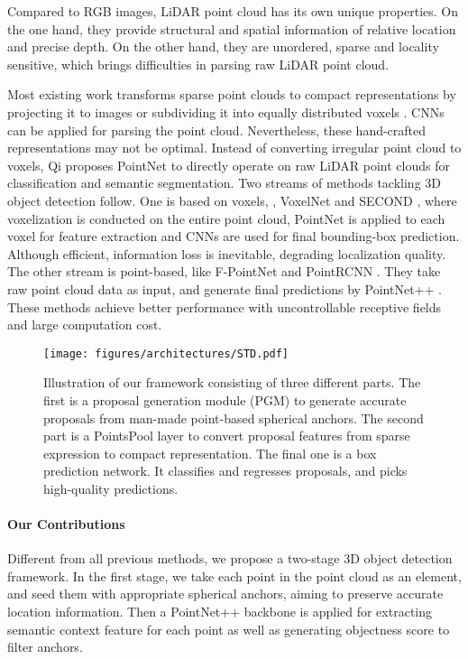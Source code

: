 \documentclass[10pt,twocolumn,letterpaper]{article}
\begin{document}
Compared to RGB images, LiDAR point cloud has its own unique properties. On the one hand, they provide structural and spatial information of relative location and precise depth. On the other hand, they are unordered, sparse and locality sensitive, which brings difficulties in parsing raw LiDAR point cloud.

Most existing work transforms sparse point clouds to compact representations by projecting it to images \cite{MV3D,AVOD,MultiViewRandomForest,PedestrianDetectionCombine,Vote3Deep} or subdividing it into equally distributed voxels \cite{VoxNet,VotetoVote,VOXELNET,YangLU18}. CNNs can be applied for parsing the point cloud. Nevertheless, these hand-crafted representations may not be optimal. Instead of converting irregular point cloud to voxels, Qi \etal proposes PointNet \cite{POINTNET,POINTNET2} to directly operate on raw LiDAR point clouds for classification and semantic segmentation. Two streams of methods tackling 3D object detection follow. One is based on voxels, \eg, VoxelNet \cite{VOXELNET} and SECOND \cite{yan2018second}, where voxelization is conducted on the entire point cloud, PointNet is applied to each voxel for feature extraction and CNNs are used for final bounding-box prediction. Although efficient, information loss is inevitable, degrading localization quality. The other stream is point-based, like F-PointNet \cite{FPOINTNET} and PointRCNN \cite{shi2018pointrcnn}. They take raw point cloud data as input, and generate final predictions by PointNet++ \cite{POINTNET2}. These methods achieve better performance with uncontrollable receptive fields and large computation cost.


\begin{figure*}[t]
	\centering
	\texttt{[image: figures/architectures/STD.pdf]}\\
	\caption{Illustration of our framework consisting of three different parts. The first is a proposal generation module (PGM) to generate  accurate proposals from man-made point-based spherical anchors. The second part is a PointsPool layer to convert proposal features from sparse expression to compact representation. The final one is a box prediction network. It classifies and regresses proposals, and picks high-quality predictions.}
	\label{fig:framework}\vspace{-0.1in}
\end{figure*}

\vspace{-0.1in}
\paragraph{Our Contributions}
Different from all previous methods, we propose a two-stage 3D object detection framework. In the first stage, we take each point in the point cloud as an element, and seed them with appropriate spherical anchors, aiming to preserve accurate location information. Then a PointNet++ backbone is applied for extracting semantic context feature for each point as well as generating objectness score to filter anchors. 
\end{document}
